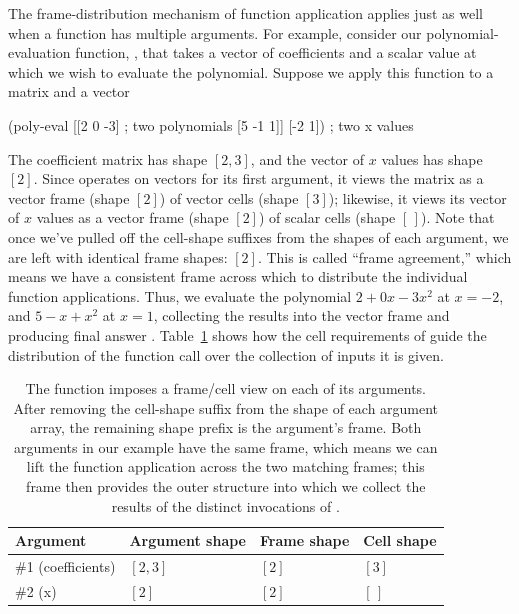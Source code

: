 The frame-distribution mechanism of function application applies
just as well when a function has multiple arguments.
For example, consider our polynomial-evaluation function, ,
that takes a vector of coefficients and a scalar value at which we
wish to evaluate the polynomial.
Suppose we apply this function to a matrix and a vector
\begin{code}
    (poly-eval [[2  0 -3]       ; two polynomials
                [5 -1  1]]
               [-2 1])          ; two x values
\result{[-10 5]}\end{code}
The coefficient matrix has shape $[2,3]$,
and the vector of $x$ values has shape $[2]$.
Since  operates on vectors for its first argument,
it views the matrix as a vector frame (shape $[2]$)
of vector cells (shape $[3]$);
likewise, it views its vector of $x$ values as
a vector frame (shape $[2]$) of scalar cells (shape $[\,]$).
Note that once we've pulled off the cell-shape suffixes from the shapes
of each argument, we are left with identical frame shapes: $[2]$.
This is called ``frame agreement,'' which means we have a consistent
frame across which to distribute the individual function applications.
Thus, we evaluate the polynomial $2 + 0x - 3x^2$ at $x = -2$,
and $5 - x + x^2$ at $x=1$, collecting the results into the vector frame
and producing final answer \ex{[-10 5]}.
Table~\ref{table:poly-eval-frame} shows how the cell requirements of
 guide the distribution of the function call over the
collection of inputs it is given.
\begin{table}
\begin{center}
\begin{tabular}{l@{\quad}l@{\quad}l@{\quad}l}
Argument                & Argument shape        & Frame shape   & Cell shape \\
\hline
\#1 (coefficients)      & $[2,3]$               & $[2]$         & $[3]$ \\
\#2 (x)                 & $[2]$                 & $[2]$         & $[\,]$
\end{tabular}
\end{center}
\caption{The  function imposes a frame/cell view on each
of its arguments. After removing the cell-shape suffix from the shape
of each argument array, the remaining shape prefix is the argument's frame.
Both arguments in our example have the same frame, which means we can lift the
function application across the two matching frames;
this frame then provides the outer structure into which we collect the
results of the distinct invocations of .
}
\label{table:poly-eval-frame}
\end{table}

